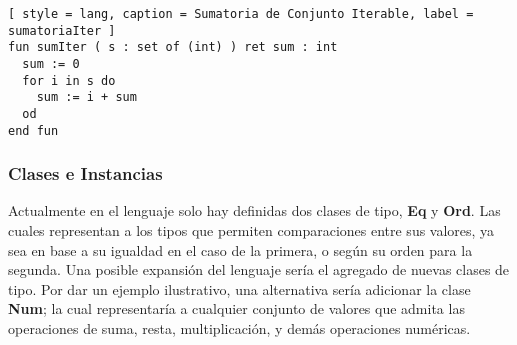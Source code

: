 \begin{lstlisting}[ style = lang, caption = Sumatoria de Conjunto Iterable, label = sumatoriaIter ]
fun sumIter ( s : set of (int) ) ret sum : int
  sum := 0
  for i in s do
    sum := i + sum
  od
end fun
\end{lstlisting}

\iffalse
Se estudiaron los mecanismos que lenguajes como \Python{} y \Java{} emplean para crear objetos iterables.
En base a esto, se discutieron distintas maneras para declarar instancias de la clase en nuestro lenguaje.
Una alternativa considerada, consistía en definir tres métodos para la estructura iterable.
El primero, inicializaba un cursor para referenciar al primer elemento de la construcción.
El segundo, verificaba si existía un sucesor en base al puntero actual.
Y finalmente, el tercero obtenía el siguiente elemento, desplazando el cursor hacia adelante.
Debido que la declaración de estructuras iterables no se adecuaba a la manera utilizada para definir instancias en el lenguaje, se decidió aplazar el diseño de esta funcionalidad para la siguiente etapa de desarrollo del intérprete.
\fi

\subsubsection{Clases e Instancias}

Actualmente en el lenguaje solo hay definidas dos clases de tipo, \textbf{Eq} y \textbf{Ord}.
Las cuales representan a los tipos que permiten comparaciones entre sus valores, ya sea en base a su igualdad en el caso de la primera, o según su orden para la segunda.
Una posible expansión del lenguaje sería el agregado de nuevas clases de tipo.
Por dar un ejemplo ilustrativo, una alternativa sería adicionar la clase \textbf{Num}; la cual representaría a cualquier conjunto de valores que admita las operaciones de suma, resta, multiplicación, y demás operaciones numéricas.

